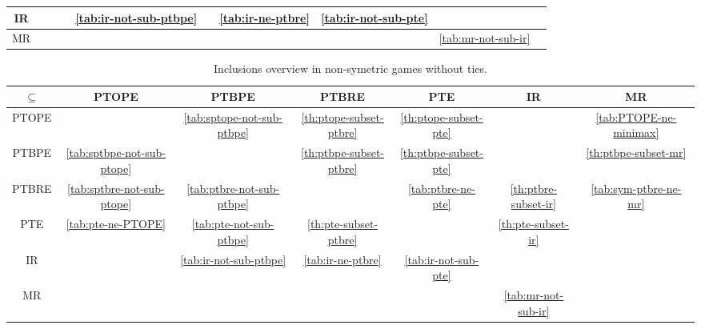 \begin{sidewaystable}
\begin{tabular}{|c|c|c|c|c|c|c|c|c|c|}
		\hline
		IR & \cellcolor{red!15} & \cellcolor{red!15} & \cellcolor{red!15} & \cellcolor{red!30} \autoref{tab:ir-not-sub-ptbpe} & \cellcolor{red!15} & \cellcolor{red!30} \autoref{tab:ir-ne-ptbre} & \cellcolor{red!30} \autoref{tab:ir-not-sub-pte} & \cellcolor{gray!30} & \cellcolor{red!15} \\
		\hline
		MR & \cellcolor{red!15} & \cellcolor{red!15} & \cellcolor{red!15} & \cellcolor{red!15} & \cellcolor{red!15} & \cellcolor{red!15} & \cellcolor{red!15} & \cellcolor{red!30} \autoref{tab:mr-not-sub-ir} & \cellcolor{gray!30} \\
		\hline
		\end{tabular}
\end{sidewaystable}

\begin{sidewaystable}
	\caption{Inclusions overview in non-symetric games without ties.}
	\begin{tabular}{|c|c|c|c|c|c|c|}
		\hline
		$\subseteq$  & PTOPE & PTBPE & PTBRE & PTE & IR & MR \\
		\hline
		PTOPE & \cellcolor{gray!30} & \cellcolor{red!30} \autoref{tab:sptope-not-sub-ptbpe} & \cellcolor{green!30} \autoref{th:ptope-subset-ptbre} & \cellcolor{green!30} \autoref{th:ptope-subset-pte} & \cellcolor{green!15} & \cellcolor{red!30} \autoref{tab:PTOPE-ne-minimax} \\
		\hline
		PTBPE & \cellcolor{red!30} \autoref{tab:sptbpe-not-sub-ptope} & \cellcolor{gray!30} & \cellcolor{green!30} \autoref{th:ptbpe-subset-ptbre} & \cellcolor{green!30} \autoref{th:ptbpe-subset-pte} & \cellcolor{green!15} & \cellcolor{green!30} \autoref{th:ptbpe-subset-mr} \\
		\hline
		PTBRE & \cellcolor{red!30} \autoref{tab:sptbre-not-sub-ptope} & \cellcolor{red!30} \autoref{tab:ptbre-not-sub-ptbpe} & \cellcolor{gray!30} & \cellcolor{red!30} \autoref{tab:ptbre-ne-pte} & \cellcolor{green!30} \autoref{th:ptbre-subset-ir} & \cellcolor{red!30} \autoref{tab:sym-ptbre-ne-mr} \\
		\hline
		PTE & \cellcolor{red!30} \autoref{tab:pte-ne-PTOPE} & \cellcolor{red!30} \autoref{tab:pte-not-sub-ptbpe} & \cellcolor{green!30} \autoref{th:pte-subset-ptbre} & \cellcolor{gray!30} & \cellcolor{green!30} \autoref{th:pte-subset-ir} & \cellcolor{red!15} \\
		\hline
		IR & \cellcolor{red!15} & \cellcolor{red!30} \autoref{tab:ir-not-sub-ptbpe} & \cellcolor{red!30} \autoref{tab:ir-ne-ptbre} & \cellcolor{red!30} \autoref{tab:ir-not-sub-pte} & \cellcolor{gray!30} & \cellcolor{red!15} \\
		\hline
		MR & \cellcolor{red!15} & \cellcolor{red!15} & \cellcolor{red!15} & \cellcolor{red!15} & \cellcolor{red!30} \autoref{tab:mr-not-sub-ir} & \cellcolor{gray!30} \\
		\hline
		\end{tabular}
\end{sidewaystable}

